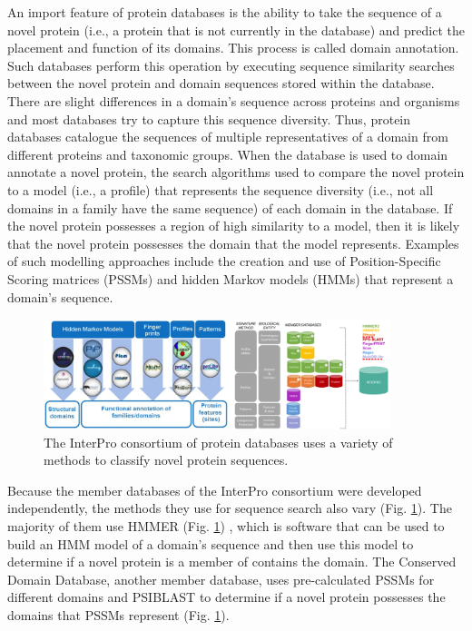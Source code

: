 An import feature of protein databases is the ability to take the sequence of a novel protein (i.e., a protein that is not currently in the database) and predict the placement and function of its domains. This process is called domain annotation. Such databases perform this operation by executing sequence similarity searches between the novel protein and domain sequences stored within the database. There are slight differences in a domain's sequence across proteins and organisms and most databases try to capture this sequence diversity. Thus, protein databases catalogue the sequences of multiple representatives of a domain from different proteins and taxonomic groups. When the database is used to domain annotate a novel protein, the search algorithms used to compare the novel protein to a model (i.e., a profile) that represents the sequence diversity (i.e., not all domains in a family have the same sequence) of each domain in the database. If the novel protein possesses a region of high similarity to a model, then it is likely that the novel protein possesses the domain that the model represents. Examples of such modelling approaches include the creation and use of Position-Specific Scoring matrices (PSSMs) \cite{stormo1982use} and hidden Markov models (HMMs) \cite{de2007hidden} that represent a domain's sequence.

\begin{figure}[!ht]
  \centering
	\includegraphics[width=0.90\textwidth]{media/InterPro.png}
	 \caption{The InterPro consortium of protein databases uses a variety of methods to classify novel protein sequences.}
	 \label{fig:interpro-databases}
\end{figure}

Because the member databases of the InterPro consortium were developed independently, the methods they use for sequence search also vary (Fig. \ref{fig:interpro-databases}). The majority of them use HMMER (Fig. \ref{fig:interpro-databases}) \cite{eddy2011accelerated}, which is software that can be used to build an HMM model of a domain's sequence and then use this model to determine if a novel protein is a member of contains the domain. The Conserved Domain Database, another member database, uses pre-calculated PSSMs for different domains and PSIBLAST \cite{altschul1997gapped} to determine if a novel protein possesses the domains that PSSMs represent (Fig. \ref{fig:interpro-databases}).

